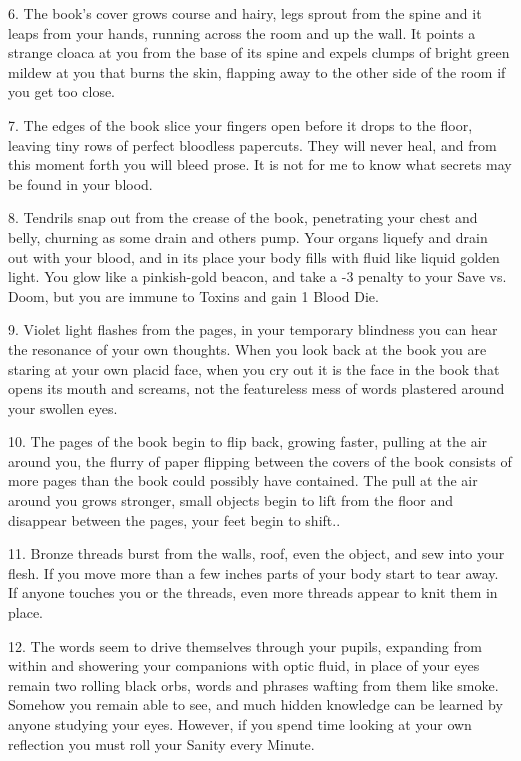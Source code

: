 6. The book's cover grows course and hairy, legs sprout from the spine and it leaps from your hands, running across the room and up the wall. It points a strange cloaca at you from the base of its spine and expels clumps of bright green mildew at you that burns the skin, flapping away to the other side of the room if you get too close.



7. The edges of the book slice your fingers open before it drops to the floor, leaving tiny rows of perfect bloodless papercuts. They will never heal, and from this moment forth you will bleed prose. It is not for me to know what secrets may be found in your blood.




8. Tendrils snap out from the crease of the book, penetrating your chest and belly, churning as some drain and others pump. Your organs liquefy and drain out with your blood, and in its place your body fills with fluid like liquid golden light. You glow like a pinkish-gold beacon, and take a -3 penalty to your Save vs. Doom, but you are immune to Toxins and gain 1 Blood Die.



9. Violet light flashes from the pages, in your temporary blindness you can hear the resonance of your own thoughts. When you look back at the book you are staring at your own placid face, when you cry out it is the face in the book that opens its mouth and screams, not the featureless mess of words plastered around your swollen eyes.




10. The pages of the book begin to flip back, growing faster, pulling at the air around you, the flurry of paper flipping between the covers of the book consists of more pages than the book could possibly have contained. The pull at the air around you grows stronger, small objects begin to lift from the floor and disappear between  the pages, your feet begin to shift..



11. Bronze threads burst from the walls, roof, even the object, and sew into your flesh. If you move more than a few inches parts of your body start to tear away. If anyone touches you or the threads, even more threads appear to knit them in place.




12. The words seem to drive themselves through your pupils, expanding from within and showering your companions with optic fluid, in place of your eyes remain two rolling black orbs, words and phrases wafting from them like smoke. Somehow you remain able to see, and much hidden knowledge can be learned by anyone studying your eyes. However, if you spend time looking at your own reflection you must roll your Sanity every Minute. 



